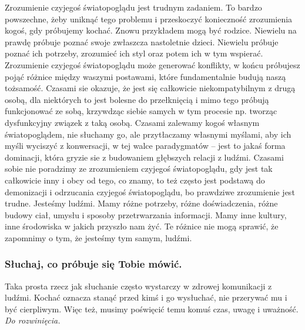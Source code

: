 \documentclass[../dotknieci-miloscia.tex]{subfiles}
\begin{document}
Zrozumienie czyjegoś światopoglądu jest trudnym zadaniem. 
To bardzo powszechne, żeby uniknąć tego problemu 
i przeskoczyć konieczność zrozumienia kogoś, gdy próbujemy kochać. 
Znowu przykładem mogą być rodzice. 
Niewielu na prawdę próbuje poznać swoje zwłaszcza nastoletnie dzieci. 
Niewielu próbuje poznać ich potrzeby, zrozumieć ich styl oraz potem ich w tym wspierać. 
Zrozumienie czyjegoś światopoglądu może generować konflikty, 
w końcu próbujesz pojąć różnice między waszymi postawami, 
które fundamentalnie budują naszą tożsamość. 
Czasami sie okazuje, że jest się całkowicie niekompatybilnym z drugą osobą, 
dla niektórych to jest bolesne do przełknięcią i mimo tego próbują funkcjonować ze sobą, 
krzywdząc siebie samych w tym procesie np. tworząc dysfunkcyjny związek z taką osobą. 
Czasami zalewamy kogoś własnym światopoglądem, 
nie słuchamy go, ale przytłaczamy własnymi myślami, 
aby ich myśli wyciszyć z konwersacji, w tej walce paradygmatów 
-- jest to jakaś forma dominacji, która gryzie sie z budowaniem głębszych relacji z ludźmi. 
Czasami sobie nie poradzimy ze zrozumieniem czyjegoś światopoglądu, 
gdy jest tak całkowicie inny i obcy od tego, co znamy, 
to też często jest podstawą do demonizacji i odrzucania czyjegoś światopoglądu, 
bo prawdziwe zrozumienie jest trudne. 
Jesteśmy ludźmi. 
Mamy różne potrzeby, różne doświadczenia, różne budowy ciał, umysłu i sposoby przetrwarzania informacji. 
Mamy inne kultury, inne środowiska w jakich przyszło nam żyć. 
Te różnice nie mogą sprawić, że zapomnimy o tym, że jesteśmy tym samym, ludźmi. 

\subsubsection{Słuchaj, co próbuje się Tobie mówić.}
Taka prosta rzecz jak słuchanie często wystarczy w zdrowej komunikacji z ludźmi. 
Kochać oznacza stanąć przed kimś i go wysłuchać, nie przerywać mu i być cierpliwym. 
Więc też, musimy poświęcić temu komuś czas, uwagę i uważność. 
\emph{Do rozwinięcia.}
\end{document}
